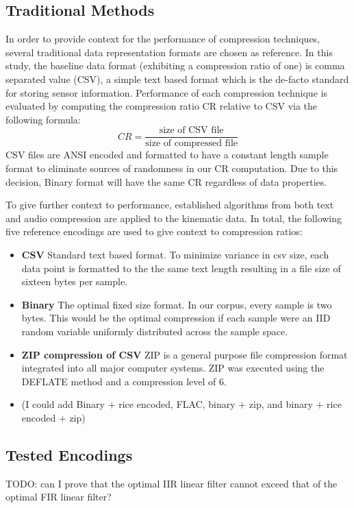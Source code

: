\documentclass[journal]{IEEEtran}
\begin{document}
\subsection{Traditional Methods}
In order to provide context for the performance of compression techniques, several traditional data representation formats are chosen as reference. In this study, the baseline data format (exhibiting a compression ratio of one) is comma separated value (CSV), a simple text based format which is the de-facto standard for storing sensor information. Performance of each compression technique is evaluated by computing the compression ratio CR relative to CSV via the following formula:
$$CR = \frac{\textrm{size of CSV file}}{\textrm{size of compressed file}}$$
CSV files are ANSI encoded and formatted to have a constant length sample format to eliminate sources of randomness in our CR computation. Due to this decision, Binary format will have the same CR regardless of data properties. 

To give further context to performance, established algorithms from both text and audio compression are applied to the kinematic data. In total, the following five reference encodings are used to give context to compression ratios:

\begin{itemize}
  \item \textbf{CSV} Standard text based format. To minimize variance in csv size, each data point is formatted to the the same text length resulting in a file size of sixteen bytes per sample.
  \item \textbf{Binary} The optimal fixed size format. In our corpus, every sample is two bytes. This would be the optimal compression if each sample were an IID random variable uniformly distributed across the sample space.
  \item \textbf{ZIP compression of CSV} ZIP is a general purpose file compression format integrated into all major computer systems. ZIP was executed using the DEFLATE method \cite{Deutsch1996} and a compression level of 6.
  \item (I could add Binary + rice encoded, FLAC, binary + zip, and binary + rice encoded + zip)
\end{itemize}
\subsection{Tested Encodings}

TODO: can I prove that the optimal IIR linear filter cannot exceed that of the optimal FIR linear filter?
\end{document}
